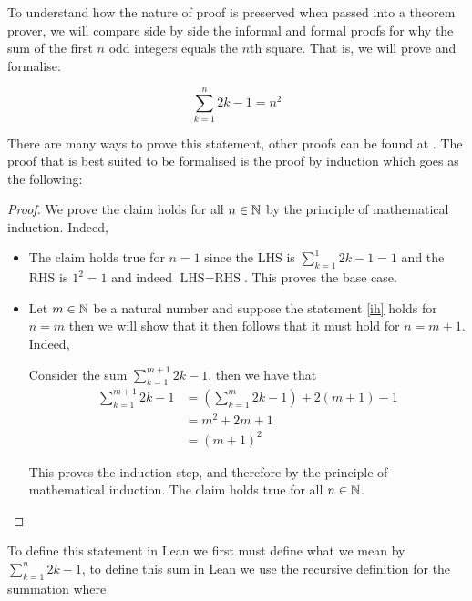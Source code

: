 \begin{example}
    To understand how the nature of proof is preserved when passed into a theorem prover, we will compare side by side the informal and formal proofs 
    for why the sum of the first $n$ odd integers equals the $n$th square. That is, we will prove and formalise:

    \begin{equation}
        \label{ih}
        \sum_{k = 1}^{n} 2k - 1 = n^2
    \end{equation}

    There are many ways to prove this statement, other proofs can be found at \cite{sangwin}. The proof that is best suited to be formalised is the
    proof by induction which goes as the following:

    \begin{proof}
        We prove the claim holds for all $n \in \mathbb{N}$ by the principle of mathematical induction. Indeed,

        \begin{itemize}
            \item The claim holds true for $n = 1$ since the LHS is $\sum_{k = 1}^{1} 2k -1 = 1$ and the RHS is $1^2 = 1$ and indeed $\textrm{LHS} = \textrm{RHS}$. This proves the base case.
            
            \item Let $m \in \mathbb{N}$ be a natural number and suppose the statement \eqref{ih} holds for $n = m$ then we will show that it then follows that it must hold for $n = m + 1$. Indeed,
            
            Consider the sum $\sum_{k = 1}^{m + 1} 2k - 1$, then we have that
            \begin{align}
                \sum_{k = 1}^{m + 1} 2k - 1 &= \left(\sum_{k = 1}^{m} 2k - 1\right) + 2(m + 1) - 1 \tag{by definition of the summation}\\
                    &=  m^2 + 2m + 1 \tag{by the induction hypothesis}\\
                    &= (m + 1)^2
            \end{align}

            This proves the induction step, and therefore by the principle of mathematical induction. The claim holds true for all $n \in \mathbb{N}$.
        \end{itemize}
    \end{proof}

    To define this statement in Lean we first must define what we mean by $\sum_{k = 1}^{n} 2k - 1$, to define this sum in Lean we use the recursive definition
    for the summation where 


\end{example}
